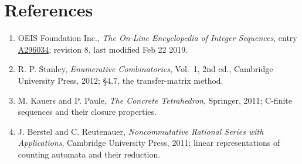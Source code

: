 \documentclass[11pt]{article}
\theoremstyle{definition}
\begin{document}
\section{References}

\begin{enumerate}

\item OEIS Foundation Inc., \emph{The On-Line Encyclopedia of Integer Sequences}, entry \href{https://oeis.org/A296034}{A296034}, revision 8, last modified Feb 22 2019.

\item R. P. Stanley, \emph{Enumerative Combinatorics}, Vol.~1, 2nd ed., Cambridge University Press, 2012; \S4.7, the transfer-matrix method.

\item M. Kauers and P. Paule, \emph{The Concrete Tetrahedron}, Springer, 2011; C-finite sequences and their closure properties.

\item J. Berstel and C. Reutenauer, \emph{Noncommutative Rational Series with Applications}, Cambridge University Press, 2011; linear representations of counting automata and their reduction.

\end{enumerate}
\end{document}

